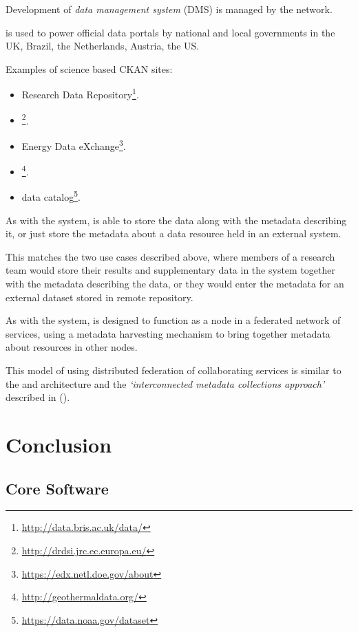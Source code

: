 \documentclass{article}
\begin{document}
Development of \cite{ckan} \textit{data management system} (DMS) is managed
by the  network.

\cite{ckan} is used to power official data portals by national and local
governments in the UK, Brazil, the Netherlands, Austria, the US.

Examples of science based CKAN sites:
\begin{itemize}
    \item {} Research Data Repository\footnote{\url{http://data.bris.ac.uk/data/}}.
    \item {}\footnote{\url{http://drdsi.jrc.ec.europa.eu/}}.
    \item {} Energy Data eXchange\footnote{\url{https://edx.netl.doe.gov/about}}.
    \item {} \footnote{\url{http://geothermaldata.org/}}.
    \item {} data catalog\footnote{\url{https://data.noaa.gov/dataset}}.
\end{itemize}

As with the \cite{metacat} system, \cite{ckan} is able to store the data
along with the metadata describing it, or just store the metadata about
a data resource held in an external system.

This matches the two use cases described above, where members of a research
team would store their results and supplementary data in the \cite{atrop}
system together with the metadata describing the data, or they would enter
the metadata for an external dataset stored in remote repository.

As with the \cite{metacat} system, \cite{ckan} is designed to function
as a node in a federated network of services, using a metadata harvesting
mechanism to bring together metadata about resources in other nodes.

This model of using distributed federation of collaborating services
is similar to the \cite{ivoa} and \cite{astro} architecture and the
\textit{`interconnected metadata collections approach'} described in
 (\cite{jones-2006}).

\section{Conclusion}

\subsection{Core Software}
\end{document}
